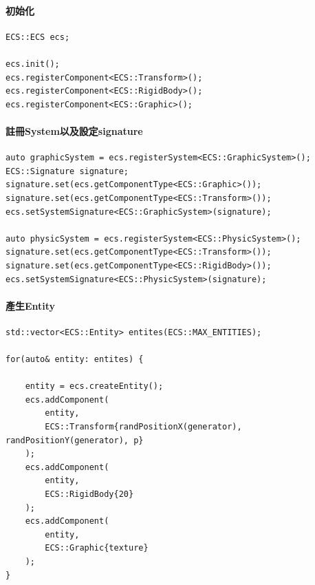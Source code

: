 \paragraph{初始化}

\begin{lstlisting}
ECS::ECS ecs;

ecs.init();
ecs.registerComponent<ECS::Transform>();
ecs.registerComponent<ECS::RigidBody>();
ecs.registerComponent<ECS::Graphic>();
\end{lstlisting}

\paragraph{註冊System以及設定signature}

\begin{lstlisting}
auto graphicSystem = ecs.registerSystem<ECS::GraphicSystem>();
ECS::Signature signature;
signature.set(ecs.getComponentType<ECS::Graphic>());
signature.set(ecs.getComponentType<ECS::Transform>());
ecs.setSystemSignature<ECS::GraphicSystem>(signature);

auto physicSystem = ecs.registerSystem<ECS::PhysicSystem>();
signature.set(ecs.getComponentType<ECS::Transform>());
signature.set(ecs.getComponentType<ECS::RigidBody>());
ecs.setSystemSignature<ECS::PhysicSystem>(signature);
\end{lstlisting}

\paragraph{產生Entity}

\begin{lstlisting}
std::vector<ECS::Entity> entites(ECS::MAX_ENTITIES);

for(auto& entity: entites) {

    entity = ecs.createEntity();
    ecs.addComponent(
        entity,
        ECS::Transform{randPositionX(generator), randPositionY(generator), p}
    );
    ecs.addComponent(
        entity,
        ECS::RigidBody{20}
    );
    ecs.addComponent(
        entity,
        ECS::Graphic{texture}
    );
}
\end{lstlisting}

\newpage